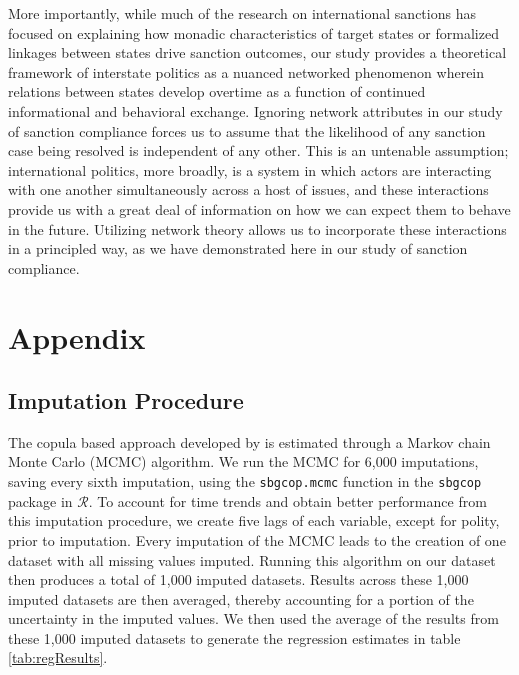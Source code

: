More importantly, while much of the research on international sanctions has focused on explaining how monadic characteristics of target states or formalized linkages between states drive sanction outcomes, our study provides a theoretical framework of interstate politics as a nuanced networked phenomenon wherein relations between states develop overtime as a function of continued informational and behavioral exchange. Ignoring network attributes in our study of sanction compliance forces us to assume that the likelihood of any sanction case being resolved is independent of any other. This is an untenable assumption; international politics, more broadly, is a system in which actors are interacting with one another simultaneously across a host of issues, and these interactions provide us with a great deal of information on how we can expect them to behave in the future. Utilizing network theory allows us to incorporate these interactions in a principled way, as we have demonstrated here in our study of sanction compliance.

\newpage
\section*{Appendix}
\label{appendix}

\subsection*{Imputation Procedure}
\label{appImp}

The copula based approach developed by \citet{hoff:2007} is estimated through a Markov chain Monte Carlo (MCMC) algorithm. We run the MCMC for 6,000 imputations, saving every sixth imputation, using the \texttt{sbgcop.mcmc} function in the \texttt{sbgcop} package in $\mathcal{R}$. To account for time trends and obtain better performance from this imputation procedure, we create five lags of each variable, except for polity, prior to imputation. Every imputation of the MCMC leads to the creation of one dataset with all missing values imputed. Running this algorithm on our dataset then produces a total of 1,000 imputed datasets. Results across these 1,000 imputed datasets are then averaged, thereby accounting for a portion of the uncertainty in the imputed values. We then used the average of the results from these 1,000 imputed datasets to generate the regression estimates in table \ref{tab:regResults}. 


\FloatBarrier

